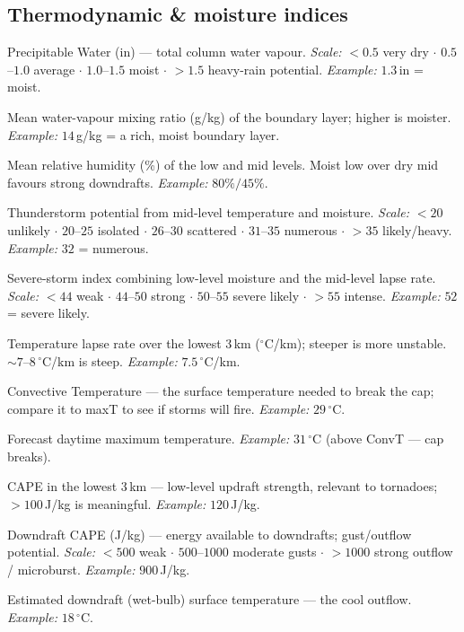\documentclass[11pt,openany]{report}
\begin{document}
\subsection{Thermodynamic \& moisture indices}
\begin{description}[leftmargin=2.6cm,style=nextline]
  \item[PW] Precipitable Water (in) --- total column water vapour. \emph{Scale:} $<\!0.5$ very dry
        $\cdot$ $0.5$--$1.0$ average $\cdot$ $1.0$--$1.5$ moist $\cdot$ $>\!1.5$ heavy-rain
        potential. \emph{Example:} $1.3$\,in = moist.
  \item[MeanW] Mean water-vapour mixing ratio (g/kg) of the boundary layer; higher is moister.
        \emph{Example:} $14$\,g/kg = a rich, moist boundary layer.
  \item[LowRH / MidRH] Mean relative humidity (\%) of the low and mid levels. Moist low over dry
        mid favours strong downdrafts. \emph{Example:} $80\%/45\%$.
  \item[K-Index] Thunderstorm potential from mid-level temperature and moisture. \emph{Scale:}
        $<\!20$ unlikely $\cdot$ $20$--$25$ isolated $\cdot$ $26$--$30$ scattered $\cdot$ $31$--$35$
        numerous $\cdot$ $>\!35$ likely/heavy. \emph{Example:} $32$ = numerous.
  \item[Total Totals] Severe-storm index combining low-level moisture and the mid-level lapse rate.
        \emph{Scale:} $<\!44$ weak $\cdot$ $44$--$50$ strong $\cdot$ $50$--$55$ severe likely $\cdot$
        $>\!55$ intense. \emph{Example:} $52$ = severe likely.
  \item[Sfc--3km LR] Temperature lapse rate over the lowest 3\,km ($^\circ$C/km); steeper is more
        unstable. $\sim\!7$--$8\,^\circ$C/km is steep. \emph{Example:} $7.5\,^\circ$C/km.
  \item[ConvT] Convective Temperature --- the surface temperature needed to break the cap; compare
        it to maxT to see if storms will fire. \emph{Example:} $29\,^\circ$C.
  \item[maxT] Forecast daytime maximum temperature. \emph{Example:} $31\,^\circ$C (above ConvT ---
        cap breaks).
  \item[3CAPE] CAPE in the lowest 3\,km --- low-level updraft strength, relevant to tornadoes;
        $>\!100$\,J/kg is meaningful. \emph{Example:} $120$\,J/kg.
  \item[DCAPE] Downdraft CAPE (J/kg) --- energy available to downdrafts; gust/outflow potential.
        \emph{Scale:} $<\!500$ weak $\cdot$ $500$--$1000$ moderate gusts $\cdot$ $>\!1000$ strong
        outflow / microburst. \emph{Example:} $900$\,J/kg.
  \item[DownT] Estimated downdraft (wet-bulb) surface temperature --- the cool outflow.
        \emph{Example:} $18\,^\circ$C.
\end{description}
\end{document}
